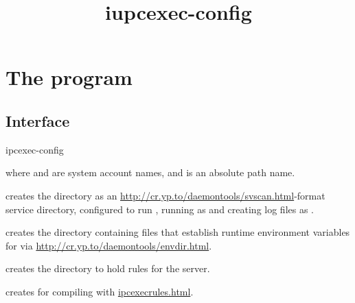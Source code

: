 \documentclass{book}
\title{iupcexec-config}
\begin{document}
\section{The  program}

\subsection{Interface}
\begin{code}%
  ipcexec-config   
\end{code}
where  and  are system account names,
and  is an absolute path name.

 creates the directory  as an
\href{svscan}{http://cr.yp.to/daemontools/svscan.html}-format service
directory, configured to run , running  as 
and creating log files as .

 creates the directory 
containing files that establish runtime environment variables for
 via \href{envdir}{http://cr.yp.to/daemontools/envdir.html}.

 creates the directory  to hold rules
for the  server.

 creates  for compiling
 with \href{\cmd{ipcexecrules}}{ipcexecrules.html}.
\end{document}
